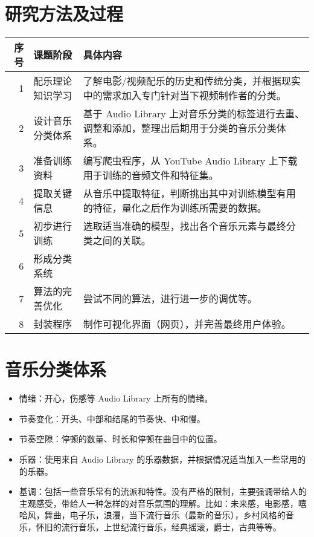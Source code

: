 \documentclass[a4paper,utf8,10pt]{article}
\newcommand{\sept}{\setlength\itemsep{-4pt}}
\begin{document}
\section{研究方法及过程}
\noindent\begin{tabular}{ r | l | p{13.5cm} }
\hline
序号 & 课题阶段         & 具体内容                                                                                     \\ \hline
   1 & 配乐理论知识学习 & 了解电影/视频配乐的历史和传统分类，并根据现实中的需求加入专门针对当下视频制作者的分类。      \\ \hline
   2 & 设计音乐分类体系 & 基于 Audio Library 上对音乐分类的标签进行去重、调整和添加，整理出后期用于分类的音乐分类体系。\\ \hline
   3 & 准备训练资料     & 编写爬虫程序，从 YouTube Audio Library 上下载用于训练的音频文件和特征集。                    \\ \hline
   4 & 提取关键信息     & 从音乐中提取特征，判断挑出其中对训练模型有用的特征，量化之后作为训练所需要的数据。           \\ \hline
   5 & 初步进行训练     & 选取适当准确的模型，找出各个音乐元素与最终分类之间的关联。                                   \\ \hline
   6 & 形成分类系统     &                                                                                              \\ \hline
   7 & 算法的完善优化   & 尝试不同的算法，进行进一步的调优等。                                                         \\ \hline
   8 & 封装程序         & 制作可视化界面（网页），并完善最终用户体验。                                                 \\ \hline
\end{tabular}

\section{音乐分类体系}

\noindent\begin{itemize}
  \sept
  \item 情绪：开心，伤感等 Audio Library 上所有的情绪。
  \item 节奏变化：开头、中部和结尾的节奏快、中和慢。
  \item 节奏空隙：停顿的数量、时长和停顿在曲目中的位置。
  \item 乐器：使用来自 Audio Library 的乐器数据，并根据情况适当加入一些常用的的乐器。
  \item 基调：包括一些音乐常有的流派和特性。没有严格的限制，主要强调带给人的主观感受，带给人一种怎样的对音乐氛围的理解。比如：未来感，电影感，嘻哈风，舞曲，电子乐，浪漫，当下流行音乐（最新的音乐），乡村风格的音乐，怀旧的流行音乐，上世纪流行音乐，经典摇滚，爵士，古典等等。
\end{itemize}
\end{document}
